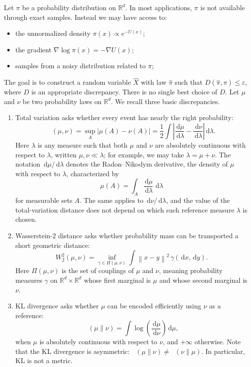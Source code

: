 \documentclass{amsart}
\numberwithin{equation}{section}
\theoremstyle{plain}
\theoremstyle{definition}
\theoremstyle{remark}
\DeclareMathOperator{\KL}{D_{\mathsf{KL}}}
\DeclareMathOperator{\TV}{D_{\mathsf{TV}}}
\newcommand{\R}{\mathbb{R}}
\newcommand{\dd}{\,\mathrm{d}}
\newcommand{\wh}[1]{\widehat{#1}}
\newcommand{\deltaerr}{\varepsilon}
\newcommand{\norm}[1]{\left\lVert #1 \right\rVert}
\newcommand{\abs}[1]{\left\lvert #1 \right\rvert}
\begin{document}
Let $\pi$ be a probability distribution on $\R^d$.  In most applications,
$\pi$ is not available through exact samples.  Instead we may have access to:
\begin{itemize}
    \item the unnormalized density $\pi(x)\propto e^{-U(x)}$;
    \item the gradient $\nabla\log\pi(x)=-\nabla U(x)$;
    \item samples from a noisy distribution related to $\pi$;
\end{itemize}
The goal is to construct a random variable $\wh X$ with law $\wh\pi$ such that
$D(\wh\pi,\pi)\leq \deltaerr$, where $D$ is an appropriate discrepancy.  There
is no single best choice of $D$. Let $\mu$ and $\nu$ be two probability laws on $\R^d$.
We recall three basic discrepancies.
\begin{enumerate}
\item Total variation asks whether every event has nearly the right
probability:
\[
    \TV(\mu,\nu)=\sup_A\abs{\mu(A)-\nu(A)}
    =\frac12\int\abs{\frac{\dd\mu}{\dd\lambda}
    -\frac{\dd\nu}{\dd\lambda}}\dd\lambda.
\]
Here $\lambda$ is any measure such that both $\mu$ and $\nu$ are absolutely
continuous with respect to $\lambda$, written $\mu,\nu\ll\lambda$; for example,
we may take $\lambda=\mu+\nu$.  The notation $\dd\mu/\dd\lambda$ denotes the
Radon--Nikodym derivative, the density of $\mu$ with respect to $\lambda$,
characterized by
\[
    \mu(A)=\int_A \frac{\dd\mu}{\dd\lambda}\,\dd\lambda
\]
for measurable sets $A$.  The same applies to $\dd\nu/\dd\lambda$, and the
value of the total-variation distance does not depend on which such reference
measure $\lambda$ is chosen.
\item Wasserstein-$2$ distance asks whether probability mass can be
transported a short geometric distance:
\[
    W_2^2(\mu,\nu)=\inf_{\gamma\in\Pi(\mu,\nu)}
    \int \norm{x-y}^2\,\gamma(\dd x,\dd y).
\]
Here $\Pi(\mu,\nu)$ is the set of couplings of $\mu$ and $\nu$, meaning
probability measures $\gamma$ on $\R^d\times\R^d$ whose first marginal is
$\mu$ and whose second marginal is $\nu$.
\item KL divergence asks whether $\mu$ can be encoded efficiently using $\nu$
as a reference:
\[
    \KL(\mu\|\nu)
    =
    \int \log\!\left(\frac{\dd\mu}{\dd\nu}\right)\dd\mu,
\]
when $\mu$ is absolutely continuous with respect to $\nu$, and
$+\infty$ otherwise.  Note that the KL divergence is asymmetric:
$\KL(\mu\|\nu) \neq \KL(\nu\|\mu)$.  In particular, KL is not a metric.
\end{enumerate}
\end{document}
